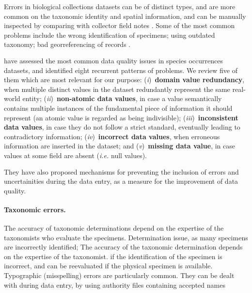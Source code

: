 Errors in biological collections datasets can be of distinct types, and are more common on the taxonomic identity and spatial information, and can be manually inspected by comparing with collector field notes \cite{Graham2004}.
Some of the most common problems include the wrong identification of specimens; using outdated taxonomy; bad georreferencing of records \cite{Soberon2004}.

 have assessed the most common data quality issues in species occurrences datasets, and identified eight recurrent patterns of problems.%
We review five of them which are most relevant for our purpose:
(\textit{i})~\textbf{domain value redundancy}, when multiple distinct values in the dataset redundantly represent the same real-world entity;
(\textit{ii})~\textbf{non-atomic data values}, in case a value semantically contains multiple instances of the fundamental piece of information it should represent (an atomic value is regarded as being indivisible);
(\textit{iii})~\textbf{inconsistent data values}, in case they do not follow a strict standard, eventually leading to contradictory information;
(\textit{iv})~\textbf{incorrect data values}, when erroneous information are inserted in the dataset; and
(\textit{v})~\textbf{missing data value}, in case values at some field are absent (\textit{i.e.} null values).


They have also proposed mechanisms for preventing the inclusion of errors and uncertainities during the data entry, as a measure for the improvement of data quality.




%
\paragraph*{Taxonomic errors.}
The accuracy of taxonomic determinations depend on the expertise of the taxonomists who evaluate the specimens.
Determination issue, as many specimens are incorrectly identified;
The accuracy of the taxonomic determination depends on the expertise of the taxonomist.
if the identification of the specimen is incorrect, and can be reevaluated if the physical specimen is available.
Typographic (misspelling) errors are particularly common.
They can be dealt with during data entry, by using authority files containing accepted names 


